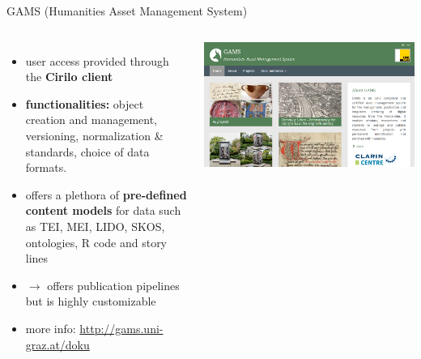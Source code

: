 \begin{frame}[allowframebreaks]{GAMS (Humanities Asset Management System)}
    \begin{columns}
    \begin{itemize}\small
        \item user access provided through the \textbf{Cirilo client}
        \item \textbf{functionalities:} object creation and management, versioning, normalization \& standards, choice of data formats.
        \item offers a plethora of \textbf{pre-defined content models} for data such as TEI, MEI, LIDO, SKOS, ontologies, R code and story lines
        \item $\to$ offers publication pipelines but is highly customizable
        \item more info: \protect\url{http://gams.uni-graz.at/doku}
    \end{itemize}
    \includegraphics[width=\textwidth]{img/gams.png}
    \end{columns}
\end{frame}




